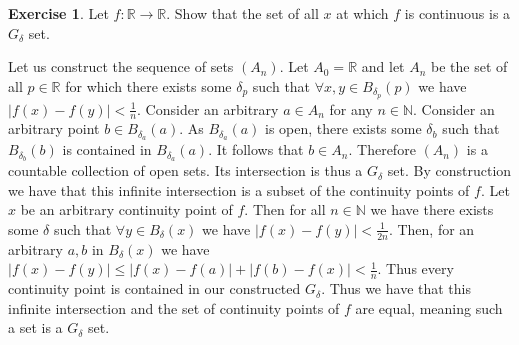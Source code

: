 \documentclass{article}
\theoremstyle{definition}
\newtheorem{exer}{Exercise}[section]
\newcommand{\N}{\mathbb{N}}
\newcommand{\R}{\mathbb{R}}
\newcommand{\abs}[1]{\lvert#1\rvert}
\newlength{\defparindent}
\newenvironment{answer}
    {\begin{mdframed}[backgroundcolor=gray!15, linewidth=0pt] \setlength{\parindent}{\defparindent}}
    {\end{mdframed}}
\begin{document}
\begin{exer}
    Let $f: \R \to \R$. Show that the set of all $x$ at which $f$ is continuous is a $G_\delta$ set.
    \begin{answer}
        Let us construct the sequence of sets $(A_n)$. Let $A_0 = \R$ and let $A_n$ be the set of all $p \in \R$ for which there exists some $\delta_p$ such that $\forall x, y \in B_{\delta_p}(p)$ we have $\abs{f(x) - f(y)} < \frac{1}{n}$. Consider an arbitrary $a \in A_n$ for any $n \in \N$. Consider an arbitrary point $b \in B_{\delta_a}(a)$. As $B_{\delta_a}(a)$ is open, there exists some $\delta_b$ such that $B_{\delta_b}(b)$ is contained in $B_{\delta_a}(a)$. It follows that $b \in A_n$. Therefore $(A_n)$ is a countable collection of open sets. Its intersection is thus a $G_\delta$ set. By construction we have that this infinite intersection is a subset of the continuity points of $f$. Let $x$ be an arbitrary continuity point of $f$. Then for all $n \in \N$ we have there exists some $\delta$ such that $\forall y \in B_{\delta}(x)$ we have $\abs{f(x) - f(y)} < \frac{1}{2n}$. Then, for an arbitrary $a, b$ in $B_{\delta}(x)$ we have $\abs{f(x) - f(y)} \le \abs{f(x) - f(a)} + \abs{f(b) - f(x)} < \frac{1}{n}$. Thus every continuity point is contained in our constructed $G_\delta$. Thus we have that this infinite intersection and the set of continuity points of $f$ are equal, meaning such a set is a $G_\delta$ set.
    \end{answer}
\end{exer}
\end{document}
